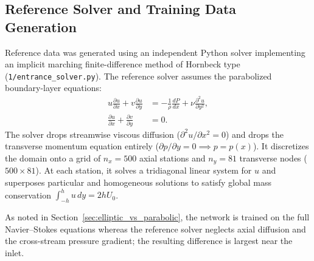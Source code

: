 \documentclass[11pt,a4paper]{article}
\begin{document}
\subsection{Reference Solver and Training Data Generation}
Reference data was generated using an independent Python solver implementing an implicit marching finite-difference method of Hornbeck type~\cite[Ch.~6, pp.~153--160]{hornbeck1973} (\texttt{1/entrance\_solver.py}).
The reference solver assumes the parabolized boundary-layer equations:
\begin{align}
u \frac{\partial u}{\partial x} + v \frac{\partial u}{\partial y} &= -\frac{1}{\rho}\frac{dP}{dx} + \nu \frac{\partial^2 u}{\partial y^2}, \\
\frac{\partial u}{\partial x} + \frac{\partial v}{\partial y} &= 0.
\end{align}
The solver drops streamwise viscous diffusion ($\partial^2 u/\partial x^2 = 0$) and drops the transverse momentum equation entirely ($\partial p/\partial y = 0 \implies p = p(x)$). It discretizes the domain onto a grid of $n_x = 500$ axial stations and $n_y = 81$ transverse nodes ($500 \times 81$). At each station, it solves a tridiagonal linear system for $u$ and superposes particular and homogeneous solutions to satisfy global mass conservation $\int_{-h}^h u\,dy = 2h U_0$. 

As noted in Section~\ref{sec:elliptic_vs_parabolic}, the network is trained on the full Navier--Stokes equations whereas the reference solver neglects axial diffusion and the cross-stream pressure gradient; the resulting difference is largest near the inlet.
\end{document}
